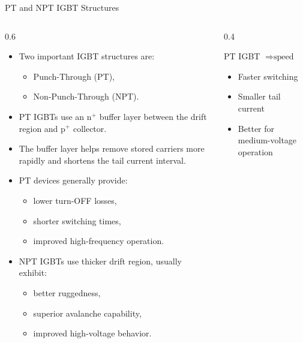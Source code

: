 \begin{frame}{PT and NPT IGBT Structures}
\begin{columns}
\begin{column}{0.6\textwidth}
\begin{itemize}
    \item Two important IGBT structures are:
    \begin{itemize}
        \item Punch-Through (PT),
        \item Non-Punch-Through (NPT).
    \end{itemize}
    
    \item PT IGBTs use an n$^+$ buffer layer between the drift region and p$^+$ collector.
    
    \item The buffer layer helps remove stored carriers more rapidly and shortens the tail current interval.
    
    \item PT devices generally provide:
    \begin{itemize}
        \item lower turn-OFF losses,
        \item shorter switching times,
        \item improved high-frequency operation.
    \end{itemize}
    
    \item NPT IGBTs use thicker drift region, usually exhibit:
    \begin{itemize}
        \item better ruggedness,
        \item superior avalanche capability,
        \item improved high-voltage behavior.
    \end{itemize}
\end{itemize}
\end{column}

\begin{column}{0.4\textwidth}
\begin{block}{PT IGBT $\Rightarrow \text{speed}$}
\begin{itemize}
    \item Faster switching
    \item Smaller tail current
    \item Better for medium-voltage operation
\end{itemize}
\end{block}


\end{column}
\end{columns}
\end{frame}
